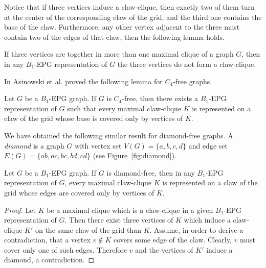     
    

Notice that if three vertices induce a claw-clique, then exactly two of them turn at the center of the corresponding  claw of the grid, and the third one contains the
base of the claw. 
Furthermore, any other vertex  adjacent to the three  must contain two of the edges of that claw, then the following lemma holds.

\begin{lema}\label{lem:cliquesMaximais}
If three vertices are together  in more than one maximal clique of a graph $G$, then in
any $B_1$-EPG representation of $G$ the three vertices do not form a claw-clique. %
\end{lema}



In \cite{ries2009} Asinowski et al. proved the following lemma for $C_4$-free graphs.

\begin{lema} \cite{ries2009} \label{lem:lemaBRies2009}
Let $G$ be a $B_1$-EPG graph. If $G$ is $C_4$-free, then there exists a $B_1$-EPG representation of $G$ such that every  maximal claw-clique $K$ is represented on a claw of the grid whose base is covered only by vertices of $K$.
\end{lema}


We have obtained the following similar result for diamond-free graphs. A \textit{diamond} is a graph $G$ with vertex set $V(G) = \{a, b, c, d\}$ and edge set $E(G)=\{ab, ac,bc, bd,cd\}$ (see Figure~\ref{fig:diamond}). %



\begin{lema}\label{lem:b1epgDiamondFree}
Let $G$ be a $B_1$-EPG graph. If $G$ is diamond-free, then in any $B_1$-EPG representation of $G$,  every maximal claw-clique $K$ is represented on a claw of the grid whose edges are covered only by vertices of $K$.
\end{lema}

\begin{proof}Let $K$ be a maximal clique which is a claw-clique in a given $B_1$-EPG representation of $G$. Then there exist three vertices of $K$ which induce a claw-clique $K'$ on
the same claw of the grid than $K$. Assume, in order to derive a contradiction, that a vertex $v\notin K$ covers some edge of the claw. Clearly, $v$ must  cover
only one of such edges. Therefore $v$ and the vertices of $K'$ induce a diamond, a contradiction. 
\end{proof}


